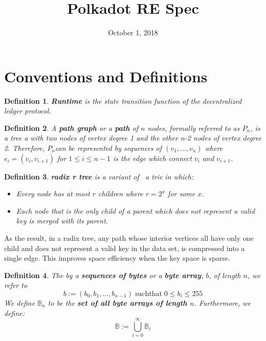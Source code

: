 \documentclass{article}
\newcommand{\assign}{:=}
\newcommand{\tmop}[1]{\ensuremath{\operatorname{#1}}}
\newcommand{\tmstrong}[1]{\textbf{#1}}
\newtheorem{definition}{Definition}
\begin{document}
\title{Polkadot RE Spec}

\date{October 1, 2018}

\maketitle

\section{Conventions and Definitions}

\begin{definition}
  {\tmstrong{Runtime}} is the state transition function of the decentralized
  ledger protocol.
\end{definition}

\begin{definition}
  \label{def-path-graph}A {\tmstrong{path graph}} or a {\tmstrong{path}} of
  $n$ nodes, formally referred to as {\tmstrong{$P_n$}}, is a tree a with two
  nodes of vertex degree 1 and the other n-2 nodes of vertex degree 2.
  Therefore, $P_n$can be represented by sequences of $(v_1, \ldots, v_n)$
  where $e_i = (v_i, v_{i + 1})$ for $1 \leqslant i \leqslant n - 1$ is the
  edge which connect $v_i$ and $v_{i + 1}$.
\end{definition}

\begin{definition}
  \label{def-radix-tree}{\tmstrong{radix r tree}} is a variant of \ a trie in
  which:
  \begin{itemize}
    \item Every node has at most $r$ children where $r = 2^x$ for some $x$.
    
    \item Each node that is the only child of a parent which does not
    represent a valid key is merged with its parent.
  \end{itemize}
\end{definition}

As the result, in a radix tree, any path whose interior vertices all have only
one child and does not represent a valid key in the data set, is compressed
into a single edge. This improves space efficiency when the key space is
sparse.

\begin{definition}
  The by a {\tmstrong{sequences of bytes}} or a {\tmstrong{byte array}}, $b$,
  of length $n$, we refer to
  \[ b \assign (b_0, b_1, ..., b_{n - 1}) \tmop{suchthat} 0 \leqslant b_i
     \leqslant 255 \]
  We define $\mathbb{B}_n$ to be the {\tmstrong{set of all byte arrays of
  length $n$}}. Furthermore, we define:
  \[ \mathbb{B} \assign \bigcup^{\infty}_{i = 0} \mathbb{B}_i \]
\end{definition}
\end{document}
